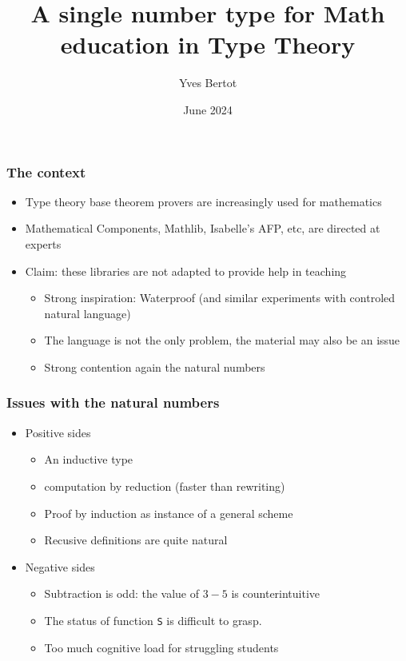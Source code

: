 \documentclass[compress]{beamer}
\title{A single number type for Math education in Type Theory}
\author{Yves Bertot}
\date{June 2024}
\begin{document}
\maketitle
\begin{frame}
\frametitle{The context}
\begin{itemize}
\item Type theory base theorem provers are increasingly used for mathematics
\item Mathematical Components, Mathlib, Isabelle's AFP, etc,
are directed at experts
\item Claim: these libraries are not adapted to provide help in teaching
\begin{itemize}
\item Strong inspiration: Waterproof (and similar experiments with controled natural language)
\item The language is not the only problem, the material may also be an issue
\item Strong contention again the natural numbers
\end{itemize}
\end{itemize}
\end{frame}
\begin{frame}
\frametitle{Issues with the natural numbers}
\begin{itemize}
\item Positive sides
\begin{itemize}
\item An inductive type
\item computation by reduction (faster than rewriting)
\item Proof by induction as instance of a general scheme
\item Recusive definitions are quite natural
\end{itemize}
\item Negative sides
\begin{itemize}
\item Subtraction is odd: the value of \(3-5\) is counterintuitive
\item The status of function {\tt S} is difficult to grasp.
\item Too much cognitive load for struggling students
\end{itemize}
\end{itemize}
\end{frame}
\end{document}
